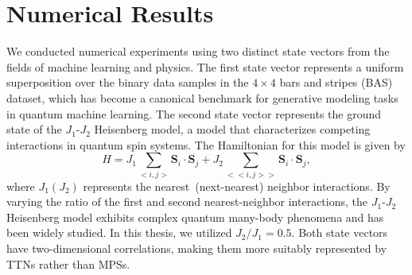 \documentclass[12pt,dvipdfmx,twoside,openright]{report}
\begin{document}






\cleardoublepage
\chapter{Numerical Results}
We conducted numerical experiments using two distinct state vectors from the fields of machine learning and physics.
The first state vector represents a uniform superposition over the binary data samples in the $4 \times 4$ bars and stripes (BAS) dataset, which has become a canonical benchmark for generative modeling tasks in quantum machine learning.
The second state vector represents the ground state of the $J_1$-$J_2$ Heisenberg model, a model that characterizes competing interactions in quantum spin systems.
The Hamiltonian for this model is given by
\begin{equation}
    H=J_1 \sum_{<i,j>} \bm{S}_i \cdot \bm{S}_j + J_2 \sum_{<<i,j>>} \bm{S}_i \cdot \bm{S}_j,
\end{equation}
where $J_1(J_2)$ represents the nearest~(next-nearest) neighbor interactions. 
By varying the ratio of the first and second nearest-neighbor interactions, the $J_1$-$J_2$ Heisenberg model exhibits complex quantum many-body phenomena and has been widely studied.
In this thesis, we utilized $J_2/J_1=0.5$.
Both state vectors have two-dimensional correlations, making them more suitably represented by TTNs rather than MPSs.
\end{document}
